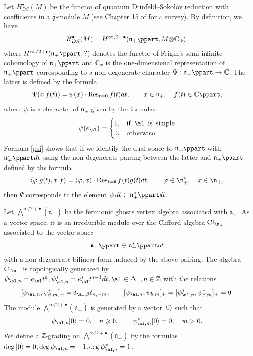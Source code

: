 \documentclass{amsart}
\newcommand{\bra}{{\langle}}
\newcommand{\ket}{{\rangle}}
\newcommand{\on}{\operatorname}
\newcommand{\+}{\mathop{\oplus}}
\renewcommand{\*}{{\otimes}}
\newcommand{\mf}{\mathfrak}
\newcommand{\affg}{\widehat{\mf{g}}}
\newcommand{\Z}{\mathbb{Z}}
\newcommand{\C}{\mathbb{C}}
\newcommand{\ra}{\rightarrow}
\def\geq{\geqslant}
\theoremstyle{theorem}
\theoremstyle{remark}
\numberwithin{equation}{section}
\begin{document}
Let $H_{DS}^\bullet(M)$ be the functor of quantum Drinfeld--Sokolov
reduction with coefficients in a $\affg$-module $M$ \cite{FF90,FF}
(see Chapter 15 of \cite{FreBen04} for a survey). By definition, we
have
\begin{align*}
H_{DS}^\bullet(M)=H^{\infty/2+\bullet}(\mf{n}_+\ppart, M\* \C_{\Psi}),
\end{align*}
where $H^{\infty/2+\bullet}(\mf{n}_+\ppart,?)$ denotes the functor of
Feigin's semi-infinite cohomology of $\mf{n}_+\ppart$ and $\C_{\Psi}$
is the one-dimensional representation of $\mf{n}_+\ppart$
corresponding to a non-degenerate character $\Psi:\mf{n}_+\ppart\ra
\C$. The latter is defined by the formula
\begin{equation}    \label{psi}
\Psi(x \; f(t)) = \psi(x) \cdot \on{Res}_{t=0} f(t) dt, \qquad x \in
\mf{n}_+, \quad f(t)
\in \C\ppart,
\end{equation}
where $\psi$ is a character of $\mf{n}_+$ given by the formulas
\begin{equation}    \label{psial}
\psi(e_\al) = \begin{cases} 1, & \on{if} \; \al \; \on{is} \;
    \on{simple} \\ 0, & \on{otherwise} \end{cases}
\end{equation}
Formula \eqref{psi} shows that
if we identify the dual space to $\mf{n}_+\ppart$ with $\mf{n}_+^*\ppart
dt$ using the non-degenerate pairing between the latter and
$\mf{n}_+\ppart$ defined by the formula
$$
\bra \varphi \; g(t) , x \; f \ket = \bra \varphi,x \ket \cdot
\on{Res}_{t=0} f(t)g(t) dt, \qquad \varphi \in \n_+^*, \quad x \in \n_+,
$$
then $\Psi$ corresponds to the element $\psi \, dt \in
\mf{n}_+^*\ppart dt$.

Let $\bigwedge^{\infty/2+\bullet}(\mf{n}_+)$ be the fermionic ghosts
vertex algebra associated with $\mf{n}_+$. As a vector space, it is an
irreducible module over the Clifford algebra $\on{Cl}_{\n_+}$
associated to the vector space
$$
\mf{n}_+\ppart \oplus \mf{n}_+^*\ppart dt
$$
with a non-degenerate bilinear form induced by the above pairing. The
algebra $\on{Cl}_{\n_+}$ is topologically generated by $\psi_{\al,n} =
e_\al t^n, \psi^*_{\al,n} = e^*_\al t^{n-1} dt, \al \in \Delta_+, n
\in \Z$ with the relations
$$
[\psi_{\al,n},\psi^*_{\beta,m}]_+ = \delta_{\al,\beta}\delta_{n,-m},
\qquad [\psi_{\al,n},\psi_{b,m}]_+ =
[\psi^*_{\al,n},\psi^*_{\beta,m}]_+ = 0.
$$
The module $\bigwedge^{\infty/2+\bullet}(\mf{n}_+)$ is generated by a
vector $|0\ket$ such that
\begin{equation}    \label{ann}
\psi_{\al,n} |0\ket = 0, \quad n\geq 0, \qquad \psi^*_{\al,m} |0\ket =
0, \quad m>0.
\end{equation}
We define a $\Z$-grading on $\bigwedge^{\infty/2+\bullet}(\mf{n}_+)$
by the formulas $\on{deg} |0\ket = 0, \on{deg} \psi_{\al,n} = -1,
\on{deg} \psi^*_{\al,n} = 1$.
\end{document}
